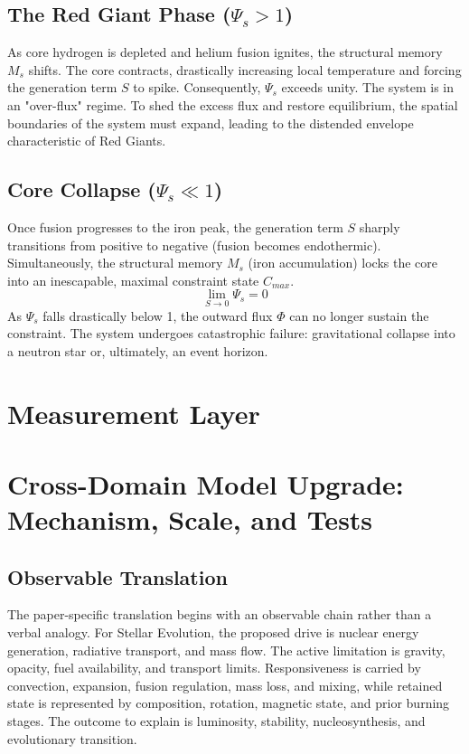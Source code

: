\documentclass[11pt,a4paper]{article}
\begin{document}
\subsection{The Red Giant Phase ($\Psi_s > 1$)}
As core hydrogen is depleted and helium fusion ignites, the structural memory $M_s$ shifts. The core contracts, drastically increasing local temperature and forcing the generation term $S$ to spike. Consequently, $\Psi_s$ exceeds unity. The system is in an "over-flux" regime. To shed the excess flux and restore equilibrium, the spatial boundaries of the system must expand, leading to the distended envelope characteristic of Red Giants.

\subsection{Core Collapse ($\Psi_s \ll 1$)}
Once fusion progresses to the iron peak, the generation term $S$ sharply transitions from positive to negative (fusion becomes endothermic). Simultaneously, the structural memory $M_s$ (iron accumulation) locks the core into an inescapable, maximal constraint state $C_{max}$.
\begin{equation}
    \lim_{S \to 0} \Psi_s = 0
\end{equation}
As $\Psi_s$ falls drastically below 1, the outward flux $\Phi$ can no longer sustain the constraint. The system undergoes catastrophic failure: gravitational collapse into a neutron star or, ultimately, an event horizon.



\section{Measurement Layer}

\section{Cross-Domain Model Upgrade: Mechanism, Scale, and Tests}

\subsection{Observable Translation}

The paper-specific translation begins with an observable chain rather than a
verbal analogy. For Stellar Evolution, the proposed drive is nuclear energy generation, radiative transport, and mass flow.
The active limitation is gravity, opacity, fuel availability, and transport limits. Responsiveness is carried by
convection, expansion, fusion regulation, mass loss, and mixing, while retained state is represented by
composition, rotation, magnetic state, and prior burning stages. The outcome to explain is luminosity, stability, nucleosynthesis, and evolutionary transition.
\end{document}
